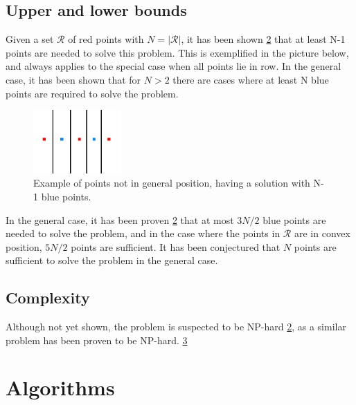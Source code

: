 \documentclass[a4paper,12pt]{article}
\begin{document}
\subsection{Upper and lower bounds}
Given a set $\mathcal{R}$ of red points with $N = |\mathcal{R}|$, it has been shown \hyperref[ref:blocking]{2} that at least N-1 points are needed to solve this problem. This is exemplified in the picture below, and always applies to the special case when all points lie in row. In the general case, it has been shown that for $N>2$ there are cases where at least N blue points are required to solve the problem.

\begin{figure}[hb]
\centering
\includegraphics[width=0.3\textwidth]{pictures/N-1solution.png}
 \caption[Close up of \textit{Hemidactylus} sp.]
{Example of points not in general position, having a solution with N-1 blue points.}
\end{figure}

In the general case, it has been proven \hyperref[ref:blocking]{2} that at most $3N/2$ blue points are needed to solve the problem, and in the case where the points in  $\mathcal{R}$ are in convex position, $5N/2$ points are sufficient. It has been conjectured that $N$ points are sufficient to solve the problem in the general case.


\subsection{Complexity}
Although not yet shown, the problem is suspected to be NP-hard \hyperref[ref:blocking]{2}, as a similar problem has been proven to be NP-hard. \hyperref[ref:alexander]{3}

\section{Algorithms}
\end{document}
